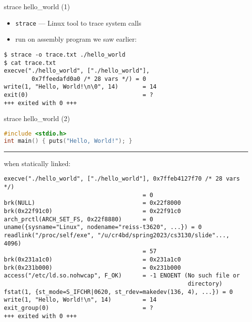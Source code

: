 \begin{frame}[fragile]{strace hello\_world (1)}
\begin{itemize}
\item \texttt{strace} --- Linux tool to trace system calls
\item run on assembly program we saw earlier:
\end{itemize}
\begin{Verbatim}[fontsize=\small]
$ strace -o trace.txt ./hello_world
$ cat trace.txt
execve("./hello_world", ["./hello_world"],
        0x7ffeedafd0a0 /* 28 vars */) = 0
write(1, "Hello, World!\n\0", 14)       = 14
exit(0)                                 = ?
+++ exited with 0 +++
\end{Verbatim}
\end{frame}

\begin{frame}[fragile]{strace hello\_world (2)}
\begin{lstlisting}[language=C,style=small]
#include <stdio.h>
int main() { puts("Hello, World!"); }
\end{lstlisting}
\hrule
when statically linked:
\begin{Verbatim}[fontsize=\fontsize{10}{11}\selectfont]
execve("./hello_world", ["./hello_world"], 0x7ffeb4127f70 /* 28 vars */)
                                        = 0
brk(NULL)                               = 0x22f8000
brk(0x22f91c0)                          = 0x22f91c0
arch_prctl(ARCH_SET_FS, 0x22f8880)      = 0
uname({sysname="Linux", nodename="reiss-t3620", ...}) = 0
readlink("/proc/self/exe", "/u/cr4bd/spring2023/cs3130/slide"..., 4096)
                                        = 57
brk(0x231a1c0)                          = 0x231a1c0
brk(0x231b000)                          = 0x231b000
access("/etc/ld.so.nohwcap", F_OK)      = -1 ENOENT (No such file or
                                                     directory)
fstat(1, {st_mode=S_IFCHR|0620, st_rdev=makedev(136, 4), ...}) = 0
write(1, "Hello, World!\n", 14)         = 14
exit_group(0)                           = ?
+++ exited with 0 +++
\end{Verbatim}
\end{frame}

